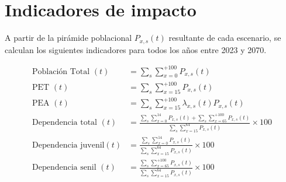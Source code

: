 \documentclass[12pt,a4paper]{article}
\begin{document}



\section{Indicadores de impacto}

A partir de la pirámide poblacional $P_{x,s}(t)$ resultante de cada escenario, se calculan los siguientes indicadores para todos los años entre 2023 y 2070.


\begin{align}
\text{Población Total }(t) &= \sum_s\sum_{x=0}^{+100} P_{x,s}(t) \label{eq:pop_total} \\[10pt]
\text{PET }(t) &= \sum_s\sum_{x=15}^{+100} P_{x,s}(t) \label{eq:pet} \\[10pt]
\text{PEA }(t) &= \sum_s\sum_{x=15}^{+100} \lambda_{x,s}(t)P_{x,s}(t) \label{eq:pea} \\[10pt]
\text{Dependencia total }(t) &= \frac{\displaystyle\sum_s\sum_{x=0}^{14} P_{x,s}(t) + \sum_s\sum_{x=65}^{+100} P_{x,s}(t)}{\displaystyle\sum_s\sum_{x=15}^{64} P_{x,s}(t)} \times 100 \label{eq:dep_total} \\[10pt]
\text{Dependencia juvenil}(t) &= \frac{\displaystyle\sum_s\sum_{x=0}^{14} P_{x,s}(t)}{\displaystyle\sum_s\sum_{x=15}^{64} P_{x,s}(t)} \times 100 \label{eq:dep_juv} \\[10pt]
\text{Dependencia senil }(t) &= \frac{\displaystyle\sum_s\sum_{x=65}^{+100} P_{x,s}(t)}{\displaystyle\sum_s\sum_{x=15}^{64} P_{x,s}(t)} \times 100 \label{eq:dep_sen}
\end{align}
\end{document}
